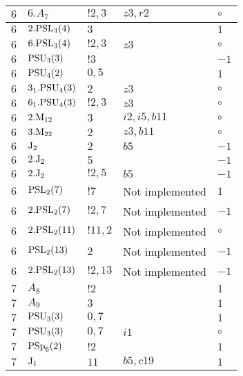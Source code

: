 \documentclass[a4paper, 11pt]{article}
\begin{document}
\begin{longtable}{lllll}
        $ 6 $ & $ 6.A_{7} $ & $ ! 2,3 $ & $ z3, r2 $ &  $\circ$ \\ \hline
        $ 6 $ & $ 2.{\rm PSL}_{3}(4) $ & $ 3 $ & $ ~ $ & $ 1$ \\ \hline
        $ 6 $ & $ 6.{\rm PSL}_{3}(4) $ & $ ! 2,3 $ & $ z3 $ &  $\circ$ \\ \hline
        $ 6 $ & $ {\rm PSU}_{3}(3) $ & $ ! 3 $ & $ ~ $ & $ -1$ \\ \hline
        $ 6 $ & $ {\rm PSU}_{4}(2) $ & $ 0,5 $ & $ ~ $ & $ 1$ \\ \hline
        $ 6 $ & $ 3_1.{\rm PSU}_{4}(3) $ & $ 2 $ & $ z3 $ &  $\circ$ \\ \hline
        $ 6 $ & $ 6_1.{\rm PSU}_{4}(3) $ & $ ! 2,3 $ & $ z3 $ &  $\circ$ \\ \hline
        $ 6 $ & $ 2.{\rm M}_{12} $ & $ 3 $ & $ i2, i5, b11 $ &  $\circ$ \\ \hline
        $ 6 $ & $ 3.{\rm M}_{22} $ & $ 2 $ & $ z3, b11 $ &  $\circ$ \\ \hline
        $ 6 $ & $ {\rm J}_2 $ & $ 2 $ & $ b5 $ & $ -1$ \\ \hline
        $ 6 $ & $ 2.{\rm J}_2 $ & $ 5 $ & $ ~ $ & $ -1$ \\ \hline
        $ 6 $ & $ 2.{\rm J}_2 $ & $ ! 2,5 $ & $ b5 $ & $ -1$ \\ \hline
        $ 6 $ & $ {\rm PSL}_{2}(7) $ & $ !7 $ &  Not implemented & $ 1$ \\ \hline
        $ 6 $ & $ 2.{\rm PSL}_{2}(7) $ & $ !2, 7 $ &  Not implemented & $ -1$ \\ \hline
        $ 6 $ & $ 2.{\rm PSL}_{2}(11) $ & $ !11, 2 $ &  Not implemented &  $\circ$ \\ \hline
        $ 6 $ & $ {\rm PSL}_{2}(13) $ & $ 2 $ &  Not implemented & $ -1$ \\ \hline
        $ 6 $ & $ 2.{\rm PSL}_{2}(13) $ & $ !2, 13 $ &  Not implemented & $ -1$ \\ \hline
        $ 7 $ & $ A_{8} $ & $ ! 2 $ & $ ~ $ & $ 1$ \\ \hline
        $ 7 $ & $ A_{9} $ & $ 3 $ & $ ~ $ & $ 1$ \\ \hline
        $ 7 $ & $ {\rm PSU}_{3}(3) $ & $ 0,7 $ & $ ~ $ & $ 1$ \\ \hline
        $ 7 $ & $ {\rm PSU}_{3}(3) $ & $ 0,7 $ & $ i1 $ &  $\circ$ \\ \hline
        $ 7 $ & $ {\rm PSp}_{6}(2) $ & $ ! 2 $ & $ ~ $ & $ 1$ \\ \hline
        $ 7 $ & $ {\rm J}_1 $ & $ 11 $ & $ b5, c19 $ & $ 1$ \\ \hline

\end{longtable}
\end{document}
